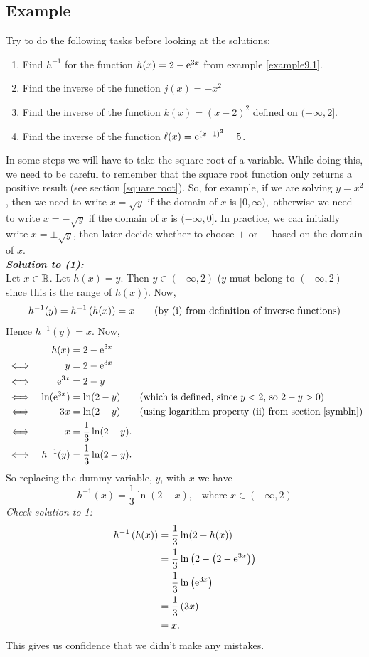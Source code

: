 \subsection{Example}
Try to do the following tasks before looking at the solutions:
\begin{enumerate}
\item Find $h^{-1}$ for the function $h(x) = 2 - \mathrm{e}^{3x}$ from example \ref{example9.1}.
\item Find the inverse of the function $j(x) = -x^2$
\item Find the inverse of the function $k(x) = (x - 2)^2$ defined on $(-\infty,2].$
\item Find the inverse of the function $\ell(x) = \mathrm{e}^{(x-1)^3} - 5$.
\end{enumerate}
In some steps we will have to take the square root of a variable. While doing this, we need to be careful to remember that the square root function only returns a positive result (see section \ref{square root}). So, for example, if we are solving $y = x^2$, then we need to write $x = \sqrt{y}$ if the domain of $x$ is $[0,\infty),$ otherwise we need to write $x = -\sqrt{y}$ if the domain of $x$ is $(-\infty,0]$. In practice, we can initially write $x = \pm\sqrt{y}$, then later decide whether to choose $+$ or $-$ based on the domain of $x$. \\


\bigskip
\noindent \textbf{\textit{Solution to (1):}} \\ 
Let $x \in \mathbb{R}$. Let $h(x) = y$. Then $y \in (-\infty,2)$ ($y$ must belong to $(-\infty,2)$ since this is the range of $h(x)$). Now,
\[
h^{-1}(y) = h^{-1}\left(h(x)\right) = x \tag{by (i) from definition of inverse functions}
\]
Hence $h^{-1}(y) = x$. Now,
\begin{alignat*}{2}
&& h(x) 
& = 2 - \e^{3x} \\
&\iff 
& y 
& = 2 - \e^{3x} \\
&\iff
& \e^{3x}
& = 2 - y \\
& \iff
& \ln(\e^{3x})
& = \ln(2-y) \tag{which is defined, since $y < 2$, so $2-y > 0$} \\
& \iff
& 3x
& = \ln(2-y) \tag{using logarithm property (ii) from section \ref{symbln}}\\
&\iff
& x
& = \frac{1}{3}\ln(2-y). \\
& \iff
& h^{-1}(y)
& = \frac{1}{3}\ln(2-y).
\end{alignat*}
So replacing the dummy variable, $y$, with $x$ we have
\[
h^{-1}(x) = \frac{1}{3}\ln(2-x), \;\;\; \text{where $x \in (-\infty,2)$}
\]
\noindent \textit{Check solution to 1:} \\
\begin{align*}
h^{-1}\left(h(x)\right) & = \frac{1}{3}\ln(2-h(x)) \\ 
			      & = \frac{1}{3}\ln\left(2 - \left(2-\mathrm{e}^{3x}\right)\right) \\
			      & = \frac{1}{3}\ln\left(\mathrm{e}^{3x}\right) \\
			      & = \frac{1}{3}\left(3x\right) \\
			      & = x.
\end{align*}
This gives us confidence that we didn't make any mistakes. \\

